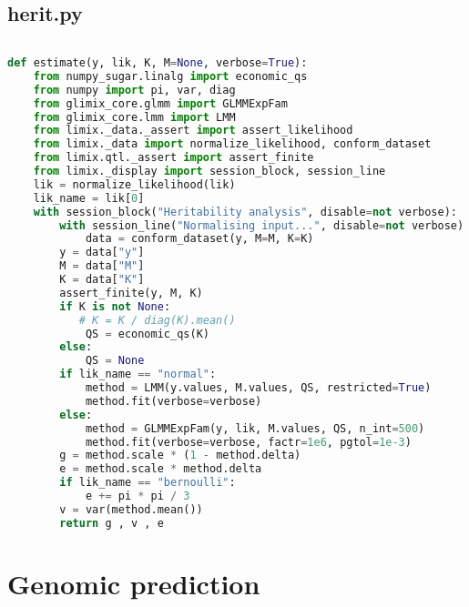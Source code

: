 \subsection{herit.py}
\begin{lstlisting}[language=Python]
  
def estimate(y, lik, K, M=None, verbose=True):
    from numpy_sugar.linalg import economic_qs
    from numpy import pi, var, diag
    from glimix_core.glmm import GLMMExpFam
    from glimix_core.lmm import LMM
    from limix._data._assert import assert_likelihood
    from limix._data import normalize_likelihood, conform_dataset 
    from limix.qtl._assert import assert_finite
    from limix._display import session_block, session_line
    lik = normalize_likelihood(lik)
    lik_name = lik[0]
    with session_block("Heritability analysis", disable=not verbose):
        with session_line("Normalising input...", disable=not verbose):
            data = conform_dataset(y, M=M, K=K)
        y = data["y"]
        M = data["M"]
        K = data["K"]
        assert_finite(y, M, K)
        if K is not None:
           # K = K / diag(K).mean()
            QS = economic_qs(K)
        else:
            QS = None
        if lik_name == "normal":
            method = LMM(y.values, M.values, QS, restricted=True)
            method.fit(verbose=verbose)
        else:
            method = GLMMExpFam(y, lik, M.values, QS, n_int=500)
            method.fit(verbose=verbose, factr=1e6, pgtol=1e-3)
        g = method.scale * (1 - method.delta)
        e = method.scale * method.delta
        if lik_name == "bernoulli":
            e += pi * pi / 3
        v = var(method.mean())
        return g , v , e 


      \end{lstlisting}





\section{Genomic prediction}
